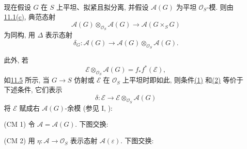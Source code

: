 现在假设 \(G\) 在 \(S\) 上平坦、拟紧且拟分离,
并假设 \(\mathcal A(G)\) 为平坦 \(\mathcal O_S\)-模.
则由\hyperref[concl:sga3-VIB-11.1-c]{11.1\textup{(c)}}, 典范态射
\[
  \mathcal A(G)\otimes_{\mathcal O_S}\mathcal A(G)
    \longrightarrow
  \mathcal A(G\times_SG)
\]
为同构, 用 \(\Delta\) 表示态射
\[
  \delta_G:\mathcal A(G)\longrightarrow
  \mathcal A(G)\otimes_{\mathcal O_S}\mathcal A(G).
\]

此外, 若
\[
  \mathcal E\otimes_{\mathcal O_S}\mathcal A(G)
    =f_*f^*(\mathcal E),
\]
如\hyperref[prop:sga3-VIB-11.5]{11.5} 所示,
当 \(G\to S\) 仿射或 \(\mathcal E\) 在 \(\mathcal O_S\) 上平坦时即如此,
则条件\hyperref[diag:sga3-VIB-11.6-1]{\textup{(1)}}
和\hyperref[diag:sga3-VIB-11.6-2]{\textup{(2)}} 等价于下述条件,
它们表示
\[
  \delta:\mathcal E\longrightarrow
  \mathcal E\otimes_{\mathcal O_S}\mathcal A(G)
\]
将 \(\mathcal E\) 赋成右 \(\mathcal A(G)\)-余模
\textup{(参见 I, )}:

\smallskip
{}\label{cond:sga3-VIB-11.6-CM1}%
\noindent\textup{(CM 1)}
令 \(\mathcal A=\mathcal A(G)\). 下图交换:
\begin{center}
  \label{diag:sga3-VIB-11.6-CM1}%
\end{center}

\smallskip
{}\label{cond:sga3-VIB-11.6-CM2}%
\noindent\textup{(CM 2)}
用 \(\eta:\mathcal A\to\mathcal O_S\) 表示态射
\(\mathcal A(\varepsilon)\). 下图交换:
\begin{center}
  \label{diag:sga3-VIB-11.6-CM2}%
\end{center}

